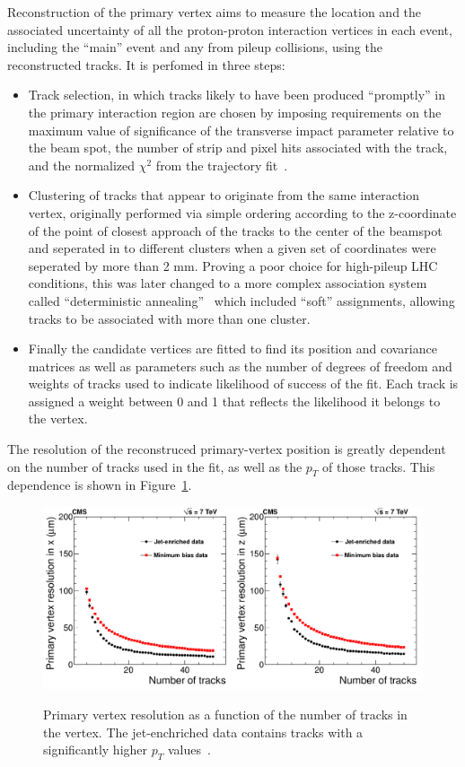 Reconstruction of the primary vertex aims to measure the location and the associated uncertainty of all the proton-proton interaction vertices in each event, including the ``main'' event and any from pileup collisions, using the reconstructed tracks.  It is perfomed in three steps:


\begin{itemize}
\item{Track selection, in which tracks likely to have been produced ``promptly'' in the primary interaction region are chosen by imposing requirements on the maximum value of significance of the transverse impact parameter relative to the beam spot, the number of strip and pixel hits associated with the track, and the normalized $\chi^2$ from the trajectory fit~\cite{TrackReco}.}
\item{Clustering of tracks that appear to originate from the same interaction vertex, originally performed via simple ordering according to the z-coordinate of the point of closest approach of the tracks to the center of the beamspot and seperated in to different clusters when a given set of coordinates were seperated by more than 2 mm.  Proving a poor choice for high-pileup LHC conditions, this was later changed to a more complex association system called ``deterministic annealing''~\cite{} which included ``soft'' assignments, allowing tracks to be associated with more than one cluster.}
\item{Finally the candidate vertices are fitted to find its position and covariance matrices as well as parameters such as the number of degrees of freedom and weights of tracks used to indicate likelihood of success of the fit.  Each track is assigned a weight between 0 and 1 that reflects the likelihood it belongs to the vertex.}
\end{itemize}

The resolution of the reconstruced primary-vertex position is greatly dependent on the number of tracks used in the fit, as well as the $p_T$ of those tracks.  This dependence is shown in Figure~\ref{figapp:VertexRes}.


\begin{figure}[!Hh]
       \centering
       \includegraphics[scale=0.4]{Figures/VertexRes.png} \\
       \caption[Primary vertex resolution as a function of number of tracks.]{Primary vertex resolution as a function of the number of tracks in the vertex.  The jet-enchriched data contains tracks with a significantly higher $p_T$ values~\cite{TrackReco}.}
\label{figapp:VertexRes}
\end{figure}

